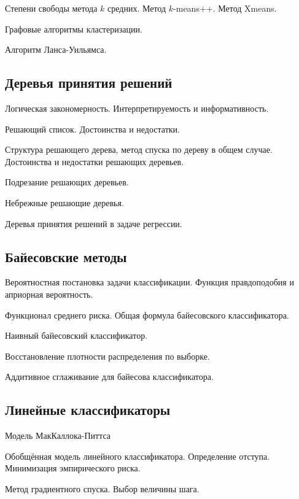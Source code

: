 \documentclass[a4paper,12pt]{article}
\begin{document}
  \myparagraph Степени свободы метода $k$ средних. Метод $k$-means++. Метод Xmeans. 
  
  \myparagraph Графовые алгоритмы кластеризации.
  
  \myparagraph Алгоритм Ланса-Уильямса.  

  \subsection*{Деревья принятия решений}  

  \myparagraph Логическая закономерность. Интерпретируемость и информативность.

  \myparagraph Решающий список. Достоинства и недостатки.
  
  \myparagraph Структура решающего дерева, метод спуска по дереву в общем случае. Достоинства и недостатки решающих деревьев.

  \myparagraph Подрезание решающих деревьев.
  
  \myparagraph Небрежные решающие деревья.
  
  \myparagraph Деревья принятия решений в задаче регрессии.
    
  \subsection*{Байесовские методы}
  
  \myparagraph Вероятностная постановка задачи классификации. Функция правдоподобия и априорная вероятность.
  
  \myparagraph Функционал среднего риска. Общая формула байесовского классификатора.
  
  \myparagraph Наивный байесовский классификатор.

  \myparagraph Восстановление плотности распределения по выборке.
  
  \myparagraph Аддитивное сглаживание для байесова классификатора.
  
  \subsection*{Линейные классификаторы}
  
  \myparagraph Модель МакКаллока-Питтса   
  
  \myparagraph Обобщённая модель линейного классификатора. Определение отступа. Минимизация эмпирического риска.

  \myparagraph Метод градиентного спуска. Выбор величины шага.
  
\end{document}
